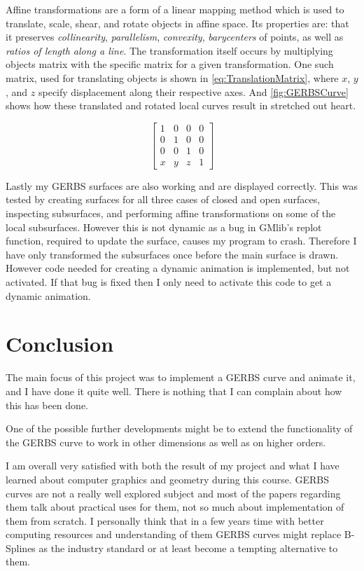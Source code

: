 \documentclass[a4paper,12pt]{extarticle}
\begin{document}
Affine transformations are a form of a linear mapping method which is used to translate, scale, shear, and rotate objects in affine space. Its properties are: that it preserves \emph{collinearity}, \emph{parallelism}, \emph{convexity}, \emph{barycenters} of points, as well as \emph{ratios of length along a line}. The transformation itself occurs by multiplying objects matrix with the specific matrix for a given transformation. One such matrix, used for translating objects is shown in \cref{eq:TranslationMatrix}, where $x$, $y$, and $z$ specify displacement along their respective axes. And \cref{fig:GERBSCurve} shows how these translated and rotated local curves result in stretched out heart.

\begin{equation}
\begin{bmatrix}
1&0&0&0\\
0&1&0&0\\
0&0&1&0\\
x&y&z&1
\end{bmatrix}
\label{eq:TranslationMatrix}
\end{equation}

Lastly my GERBS surfaces are also working and are displayed correctly. This was tested by creating surfaces for all three cases of closed and open surfaces, inspecting subsurfaces, and performing affine transformations on some of the local subsurfaces. However this is not dynamic as a bug in GMlib's replot function, required to update the surface, causes my program to crash. Therefore I have only transformed the subsurfaces once before the main surface is drawn. However code needed for creating a dynamic animation is implemented, but not activated. If that bug is fixed then I only need to activate this code to get a dynamic animation.

\section{Conclusion}
The main focus of this project was to implement a GERBS curve and animate it, and I have done it quite well. There is nothing that I can complain about how this has been done.

One of the possible further developments might be to extend the functionality of the GERBS curve to work in other dimensions as well as on higher orders.

I am overall very satisfied with both the result of my project and what I have learned about computer graphics and geometry during this course. GERBS curves are not a really well explored subject and most of the papers regarding them talk about practical uses for them, not so much about implementation of them from scratch. I personally think that in a few years time with better computing resources and understanding of them GERBS curves might replace B-Splines as the industry standard or at least become a tempting alternative to them.
\end{document}
